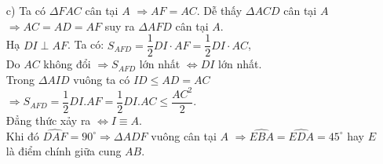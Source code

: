 \begin{ex}
{{}
\begin{enumerate}
\item[c)]  Ta có $\Delta FAC$ cân tại $A$  $ \Rightarrow AF = AC$. Dễ thấy $\Delta ACD$ cân tại $A$ $\Rightarrow AC = AD=AF$ suy ra $\Delta AFD$ cân tại $A$.\\
Hạ $DI \perp AF$. Ta có: ${S_{AFD}} = \dfrac{1}{2}DI\cdot AF = \dfrac{1}{2}DI\cdot AC$,\\
Do $AC$ không đổi $ \Rightarrow {S_{AFD}}$ lớn nhất $ \Leftrightarrow $$DI$ lớn nhất.\\
Trong $\Delta AID$ vuông ta có $ID \le AD = AC$ $ \Rightarrow {S_{AFD}} = \dfrac{1}{2}DI.AF = \dfrac{1}{2}DI.AC \le \dfrac{{AC}^2}{2}$.\\
Đẳng thức xảy ra $ \Leftrightarrow I \equiv A$.\\
Khi đó $\widehat {DAF} = {90^\circ} $$ \Rightarrow \Delta ADF$ vuông cân tại $A$ $\Rightarrow \widehat {EBA} = \widehat {EDA} = {45^\circ}$ hay $E$ là điểm chính giữa cung $AB$.
\end{enumerate}}
\end{ex}

